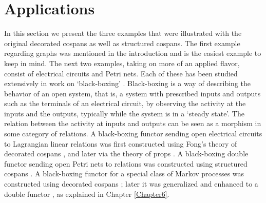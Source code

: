 \documentclass[oneside,final]{ucr}
\theoremstyle{definition}
\begin{document}
{\section{Applications}

In this section we present the three examples that were illustrated with the original decorated cospans as well as structured cospans. The first example regarding graphs was mentioned in the introduction and is the easiest example to keep in mind. The next two examples, taking on more of an applied flavor, consist of electrical circuits and Petri nets. Each of these has been studied extensively in work on `black-boxing' \cite{BCR,BF,BFP,BM,BP}. Black-boxing is a way of describing the behavior of an open system, that is, a system with prescribed inputs and outputs such as the terminals of an electrical circuit, by observing the activity at the inputs and the outputs, typically while the system is in a `steady state'. The relation between the activity at inputs and outputs can be seen as a morphism in some category of relations.  A black-boxing functor sending open electrical circuits to Lagrangian linear relations was first constructed using Fong's theory of decorated cospans \cite{BF}, and later via the theory of props \cite{BCR}. A black-boxing double functor sending open Petri nets to relations was constructed using structured cospans \cite{BM}. A black-boxing functor for a special class of Markov processes was constructed using decorated cospans \cite{BFP}; later it was generalized and enhanced to a double functor \cite{BC}, as explained in Chapter \ref{Chapter6}.



}
\end{document}
